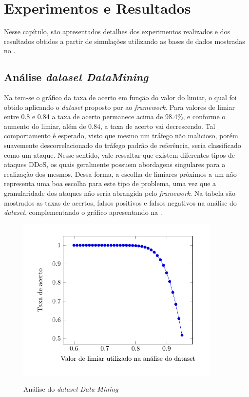 \chapter[Resultados]{Experimentos e Resultados}
\label{resultados}
Nesse capítulo, são apresentados detalhes dos experimentos realizados e dos resultados obtidos a partir de simulações utilizando as bases de dados mostradas no .

\section{Análise \textit{dataset DataMining}}  
Na  tem-se o gráfico da taxa de acerto em função do valor do limiar, o qual foi obtido aplicando o \textit{dataset} proposto por \cite{DataMining} ao \textit{framework}. Para valores de limiar entre 0.8 e 0.84 a taxa de acerto permanece acima de 98.4\%, e conforme o aumento do limiar, além de 0.84, a taxa de acerto vai decrescendo. Tal comportamento é esperado, visto que mesmo um tráfego não malicioso, porém suavemente descorrelacionado do tráfego padrão de referência, seria classificado como um ataque. Nesse sentido, vale ressaltar que existem diferentes tipos de ataques DDoS, os quais geralmente possuem abordagens singulares para a realização dos mesmos. Dessa forma, a escolha de limiares próximos a um não representa uma boa escolha para este tipo de problema, uma vez que a granularidade dos ataques não seria abrangida pelo \textit{framework}. Na tabela  são mostrados  as taxas de acertos, falsos positivos e falsos negativos na análise do \textit{dataset}, complementando o gráfico apresentando na .

 \begin{figure}[htb]
 	\centering
 	\caption{Análise do \textit{dataset} \textit{Data Mining} }
 	\includegraphics[width=0.9\textwidth]{figs/results80-95Mining.pdf}\\
 	\hspace{1.5cm}{Fonte: Elaborada pelo autor.}
 	\label{fig:ResultsMining}
 \end{figure}
 
